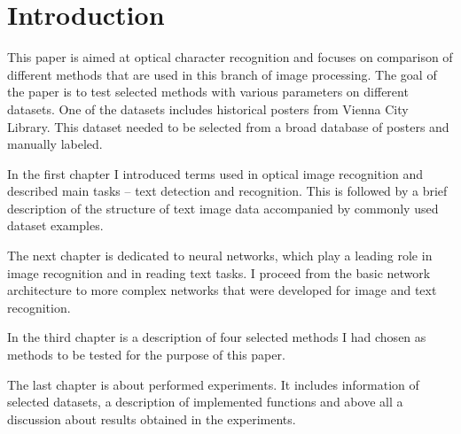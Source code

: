 \chapter*{Introduction}


This paper is aimed at optical character recognition and focuses on comparison of different methods that are used in this branch of image processing. The goal of the paper is to test selected methods with various parameters on different datasets. One of the datasets includes historical posters from Vienna City Library. This dataset needed to be selected from a broad database of posters and manually labeled.

In the first chapter I introduced terms used in optical image recognition and described main tasks -- text detection and recognition. This is followed by a brief description of the structure of text image data accompanied by commonly used dataset examples.

The next chapter is dedicated to neural networks, which play a leading role in image recognition and in reading text tasks. I proceed from the basic network architecture to more complex networks that were developed for image and text recognition.

In the third chapter is a description of four selected methods I had chosen as methods to be tested for the purpose of this paper.

The last chapter is about performed experiments. It includes information of selected datasets, a description of implemented functions and above all a discussion about results obtained in the experiments.